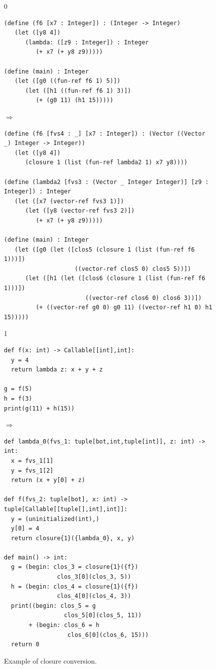 \documentclass[7x10]{TimesAPriori_MIT}%
\def\racketEd{0}
\def\pythonEd{1}
\providecommand{\BookEdition}{1}
\let\edition\BookEdition
\newcommand{\pythonColor}[0]{}
\numberwithin{theorem}{chapter}
\numberwithin{definition}{chapter}
\numberwithin{equation}{chapter}
\begin{document}
\begin{figure}[tbp]
  \begin{tcolorbox}[colback=white]
    \begin{minipage}{0.8\textwidth}
{\if\edition\racketEd
\begin{lstlisting}[basicstyle=\ttfamily\footnotesize]
(define (f6 [x7 : Integer]) : (Integer -> Integer)
   (let ([y8 4])
      (lambda: ([z9 : Integer]) : Integer
         (+ x7 (+ y8 z9)))))

(define (main) : Integer
   (let ([g0 ((fun-ref f6 1) 5)])
      (let ([h1 ((fun-ref f6 1) 3)])
         (+ (g0 11) (h1 15)))))
\end{lstlisting}
$\Rightarrow$
\begin{lstlisting}[basicstyle=\ttfamily\footnotesize]
(define (f6 [fvs4 : _] [x7 : Integer]) : (Vector ((Vector _) Integer -> Integer))
   (let ([y8 4])
      (closure 1 (list (fun-ref lambda2 1) x7 y8))))

(define (lambda2 [fvs3 : (Vector _ Integer Integer)] [z9 : Integer]) : Integer
   (let ([x7 (vector-ref fvs3 1)])
      (let ([y8 (vector-ref fvs3 2)])
         (+ x7 (+ y8 z9)))))

(define (main) : Integer
   (let ([g0 (let ([clos5 (closure 1 (list (fun-ref f6 1)))])
                    ((vector-ref clos5 0) clos5 5))])
      (let ([h1 (let ([clos6 (closure 1 (list (fun-ref f6 1)))])
                       ((vector-ref clos6 0) clos6 3))])
         (+ ((vector-ref g0 0) g0 11) ((vector-ref h1 0) h1 15)))))
\end{lstlisting}
\fi}
%
{\if\edition\pythonEd\pythonColor
\begin{lstlisting}
def f(x: int) -> Callable[[int],int]:
  y = 4
  return lambda z: x + y + z

g = f(5)
h = f(3)
print(g(11) + h(15))
\end{lstlisting}
$\Rightarrow$
\begin{lstlisting}
def lambda_0(fvs_1: tuple[bot,int,tuple[int]], z: int) -> int:
  x = fvs_1[1]
  y = fvs_1[2]
  return (x + y[0] + z)

def f(fvs_2: tuple[bot], x: int) -> tuple[Callable[[tuple[],int],int]]:
  y = (uninitialized(int),)
  y[0] = 4
  return closure{1}({lambda_0}, x, y)

def main() -> int:
  g = (begin: clos_3 = closure{1}({f})
               clos_3[0](clos_3, 5))
  h = (begin: clos_4 = closure{1}({f})
               clos_4[0](clos_4, 3))
  print((begin: clos_5 = g
                 clos_5[0](clos_5, 11))
       + (begin: clos_6 = h
                  clos_6[0](clos_6, 15)))
  return 0
\end{lstlisting}
\fi}
\end{minipage}
  \end{tcolorbox}

  \caption{Example of closure conversion.}
\label{fig:lexical-functions-example}
\end{figure}
\end{document}

